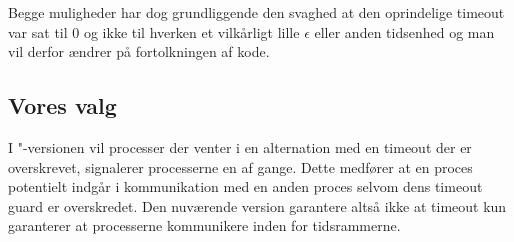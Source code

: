 Begge muligheder har dog grundliggende den svaghed at den oprindelige timeout var sat til
0 og ikke til hverken et vilkårligt lille $\epsilon$ eller anden
tidsenhed og man vil derfor ændrer på fortolkningen af kode. 

\subsection{Vores valg}
\begin{shaded}
I "-versionen vil processer der venter i en alternation med en timeout der er overskrevet, signalerer processerne en af gange. Dette
medfører at en proces potentielt indgår i kommunikation med en anden proces selvom dens timeout guard er overskredet. Den nuværende version garantere altså ikke at timeout kun garanterer at processerne kommunikere inden for tidsrammerne. 
\end{shaded}




